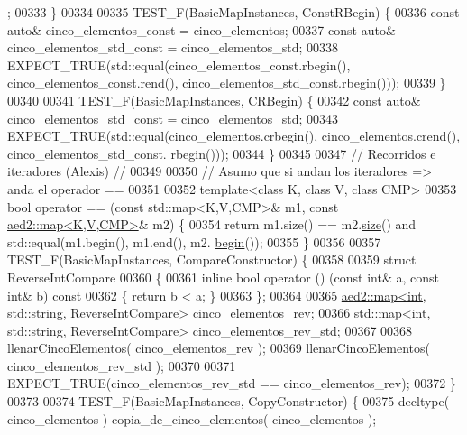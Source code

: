 \begin{DoxyCode}
      ;
00333 \}
00334 
00335 TEST\_F(BasicMapInstances, ConstRBegin) \{
00336     \textcolor{keyword}{const} \textcolor{keyword}{auto}& cinco\_elementos\_const = cinco\_elementos;
00337     \textcolor{keyword}{const} \textcolor{keyword}{auto}& cinco\_elementos\_std\_const = cinco\_elementos\_std;
00338     EXPECT\_TRUE(std::equal(cinco\_elementos\_const.rbegin(), cinco\_elementos\_const.rend(), 
      cinco\_elementos\_std\_const.rbegin()));
00339 \}
00340 
00341 TEST\_F(BasicMapInstances, CRBegin) \{
00342     \textcolor{keyword}{const} \textcolor{keyword}{auto}& cinco\_elementos\_std\_const = cinco\_elementos\_std;
00343     EXPECT\_TRUE(std::equal(cinco\_elementos.crbegin(), cinco\_elementos.crend(), cinco\_elementos\_std\_const.
      rbegin()));
00344 \}
00345 
00347 \textcolor{comment}{// Recorridos e iteradores (Alexis) //}
00349 \textcolor{comment}{}
00350 \textcolor{comment}{// Asumo que si andan los iteradores => anda el operador ==}
00351 
00352 \textcolor{keyword}{template}<\textcolor{keyword}{class} K, \textcolor{keyword}{class} V, \textcolor{keyword}{class} CMP>
00353 \textcolor{keywordtype}{bool} operator == (\textcolor{keyword}{const} std::map<K,V,CMP>& m1, \textcolor{keyword}{const} \hyperlink{classaed2_1_1map}{aed2::map<K,V,CMP>}& m2) \{
00354     \textcolor{keywordflow}{return} m1.size() == m2.\hyperlink{classaed2_1_1map_a89f2613f926ac13293eafe65889d6021_a89f2613f926ac13293eafe65889d6021}{size}() and std::equal(m1.begin(), m1.end(), m2.
      \hyperlink{classaed2_1_1map_a58a95705d54b3dda7f775ce5a22225cb_a58a95705d54b3dda7f775ce5a22225cb}{begin}());
00355 \}
00356 
00357 TEST\_F(BasicMapInstances, CompareConstructor) \{
00358 
00359     \textcolor{keyword}{struct }ReverseIntCompare
00360     \{
00361         \textcolor{keyword}{inline} \textcolor{keywordtype}{bool} operator () (\textcolor{keyword}{const} \textcolor{keywordtype}{int}& a, \textcolor{keyword}{const} \textcolor{keywordtype}{int}& b)\textcolor{keyword}{ const}
00362 \textcolor{keyword}{        }\{ \textcolor{keywordflow}{return} b < a; \}
00363     \};
00364 
00365     \hyperlink{classaed2_1_1map}{aed2::map<int, std::string, ReverseIntCompare>} 
      cinco\_elementos\_rev;
00366     std::map<int, std::string, ReverseIntCompare> cinco\_elementos\_rev\_std;
00367 
00368     llenarCincoElementos( cinco\_elementos\_rev );
00369     llenarCincoElementos( cinco\_elementos\_rev\_std );
00370 
00371     EXPECT\_TRUE(cinco\_elementos\_rev\_std == cinco\_elementos\_rev);
00372 \}
00373 
00374 TEST\_F(BasicMapInstances, CopyConstructor) \{
00375     decltype( cinco\_elementos ) copia\_de\_cinco\_elementos( cinco\_elementos );

\end{DoxyCode}
